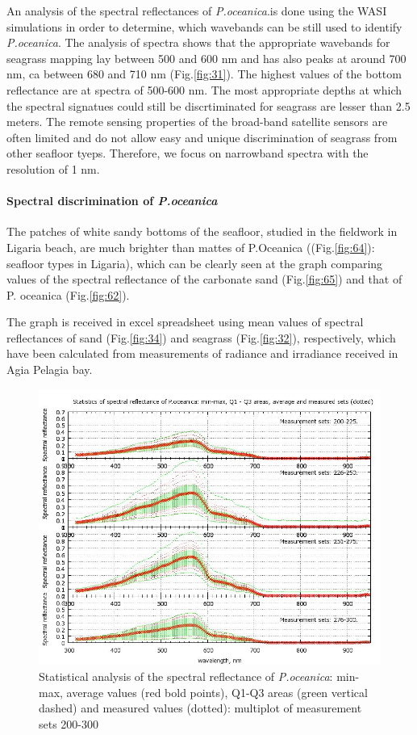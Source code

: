 \documentclass[10pt, a4paper]{article}
\begin{document}
An analysis of the spectral reflectances of \textit{P.oceanica}.is done using the WASI simulations in order to
determine, which wavebands can be still used to identify \textit{P.oceanica}. The analysis of spectra shows
that the appropriate wavebands for seagrass mapping lay between 500 and 600 nm and has
also peaks at around 700 nm, ca between 680 and 710 nm (Fig.\ref{fig:31}). The highest values of the bottom
reflectance are at spectra of 500-600 nm. The most appropriate depths at which the spectral signatues
could still be discrtiminated for seagrass are lesser than 2.5 meters.
The remote sensing properties of the broad-band satellite sensors are often limited and do not allow
easy and unique discrimination of seagrass from other seafloor tyeps. Therefore, we focus on narrowband
spectra with the resolution of 1 nm.

\paragraph{Spectral discrimination of \textit{P.oceanica}}
The patches of white sandy bottoms of the seafloor, studied in the fieldwork in Ligaria beach, are
much brighter than mattes of P.Oceanica ((Fig.\ref{fig:64}): seafloor types in Ligaria), which can be clearly seen
at the graph comparing values of the spectral reflectance of the carbonate sand (Fig.\ref{fig:65}) and that of P.
oceanica (Fig.\ref{fig:62}).

The graph is received in excel spreadsheet using mean values of spectral reflectances of
sand (Fig.\ref{fig:34}) and seagrass (Fig.\ref{fig:32}), respectively, which have been calculated from measurements of radiance and
irradiance received in Agia Pelagia bay.

\begin{figure}[h]
\centering
\includegraphics[scale=0.40]{GNU-19.jpg}
\caption{Statistical analysis of the spectral reflectance of \textit{P.oceanica}: min-max, average values (red bold points), Q1-Q3 areas (green vertical dashed) and measured values (dotted): multiplot of measurement sets 200-300}
\label{fig:33}
\end{figure}
\end{document}
